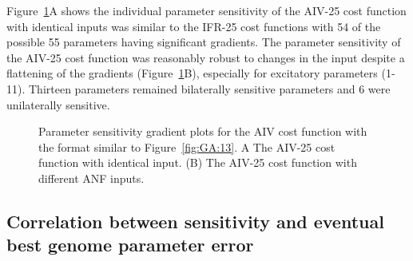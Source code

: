 Figure~\ref{fig:GA:15}A shows the individual parameter sensitivity of the
AIV-25 cost function with identical inputs was similar to the IFR-25 cost
functions with 54 of the possible 55 parameters having significant
gradients.  The parameter sensitivity of the AIV-25 cost function was
reasonably robust to changes in the {\ANF} input despite a flattening of the
gradients (Figure~\ref{fig:GA:15}B), especially for excitatory parameters
(1-11). Thirteen parameters remained bilaterally sensitive parameters and 6
were unilaterally sensitive.  %


\begin{figure}[ht]
  \centering
  \caption{Parameter sensitivity gradient plots for the AIV cost
    function with the format similar to Figure~\ref{fig:GA:13}. A The
    AIV-25 cost function with identical input. (B) The AIV-25 cost
    function with different {ANF} inputs.%
}
  \label{fig:GA:15}
\end{figure}




\subsection{Correlation between sensitivity and eventual best genome parameter error}\label{sec:GA:corr-betw-sens}





